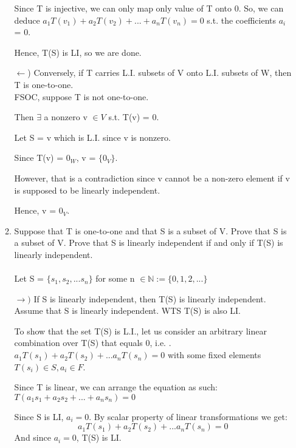 \documentclass[12pt]{article}
\begin{document}
\begin{enumerate}
\begin{enumerate}[label=(\alph*)]
            Since T is injective, we can only map only value of T onto 0. So, we can deduce $a_1T(v_1) + a_2T(v_2) + ... + a_nT(v_n) = 0$ s.t. the coefficients $a_i$ = 0. 

            Hence, T(S) is LI, so we are done.  

            
            $\leftarrow$) Conversely, if T carries L.I. subsets of V onto L.I. subsets of W, then T is one-to-one. \\ 

            FSOC, suppose T is not one-to-one. 

            Then $\exists$ a nonzero v $\in V$ s.t. T(v) = 0. 
            
            Let S = {v} which is L.I. since v is nonzero. 

            Since T(v) = $0_W$, v = $\{0_V\}$. 

            However, that is a contradiction since v cannot be a non-zero element if v is supposed to be linearly independent. 

            Hence, v = $0_V$. 
            \qedsymbol{}
            
            
            \item Suppose that T is one-to-one and that S is a subset of V. Prove that S is a subset of V. Prove that S is linearly independent if and only if T(S) is linearly independent. \\ \\ 
            Let S = $\{s_1, s_2, ... s_n\}$ for some n $\in \mathbb{N} := \{0, 1, 2, ... \}$  
            
            $\rightarrow)$ If S is linearly independent, then T(S) is linearly independent.
            Assume that S is linearly independent. WTS T(S) is also LI. 
            
            To show that the set T(S) is L.I., let us consider an arbitrary linear combination over T(S) that equals 0, i.e. . $a_1T(s_1) + a_2T(s_2) + ... a_nT(s_n) = 0$ with some fixed elements $T(s_i) \in S, a_i \in F$. 

            Since T is linear, we can arrange the equation as such: 
            $T(a_1s_1 + a_2s_2 + ... + a_ns_n) = 0$

            Since S is LI, $a_i = 0$. 
            By scalar property of linear transformations we get: \\
            \begin{equation}
                a_1T(s_1) + a_2T(s_2) + ... a_nT(s_n) = 0
            \end{equation}
            And since $a_i = 0$, T(S) is LI. 


\end{enumerate}
\end{enumerate}
\end{document}
